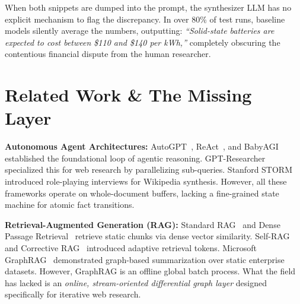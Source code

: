 \documentclass[10pt,twocolumn,letterpaper]{article}
\begin{document}
When both snippets are dumped into the prompt, the synthesizer LLM has no explicit mechanism to flag the discrepancy. In over 80\% of test runs, baseline models silently average the numbers, outputting: \textit{``Solid-state batteries are expected to cost between \$110 and \$140 per kWh,''} completely obscuring the contentious financial dispute from the human researcher.

\section{Related Work \& The Missing Layer}

\textbf{Autonomous Agent Architectures:} AutoGPT~\cite{gaia2023}, ReAct~\cite{yao2022react}, and BabyAGI established the foundational loop of agentic reasoning. GPT-Researcher~\cite{elovic2024gptr} specialized this for web research by parallelizing sub-queries. Stanford STORM~\cite{shao2024storm} introduced role-playing interviews for Wikipedia synthesis. However, all these frameworks operate on whole-document buffers, lacking a fine-grained state machine for atomic fact transitions.

\textbf{Retrieval-Augmented Generation (RAG):} Standard RAG~\cite{lewis2020rag} and Dense Passage Retrieval~\cite{karpukhin2020dpr} retrieve static chunks via dense vector similarity. Self-RAG~\cite{asai2024selfrag} and Corrective RAG~\cite{yan2024crag} introduced adaptive retrieval tokens. Microsoft GraphRAG~\cite{edge2024graphrag} demonstrated graph-based summarization over static enterprise datasets. However, GraphRAG is an offline global batch process. What the field has lacked is an \textit{online, stream-oriented differential graph layer} designed specifically for iterative web research.

\begin{table}[h]
\centering
{}
\caption{Systematic architectural comparison across knowledge ingestion frameworks.}
\label{tab:comparison}
\end{table}
\end{document}
